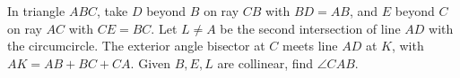 In triangle $ABC$, take $D$ beyond $B$ on ray $CB$ with $BD=AB$, and $E$ beyond $C$ on ray $AC$ with $CE=BC$. Let $L\ne A$ be the second intersection of line $AD$ with the circumcircle. The exterior angle bisector at $C$ meets line $AD$ at $K$, with $AK=AB+BC+CA$. Given $B,E,L$ are collinear, find $\angle CAB$.

